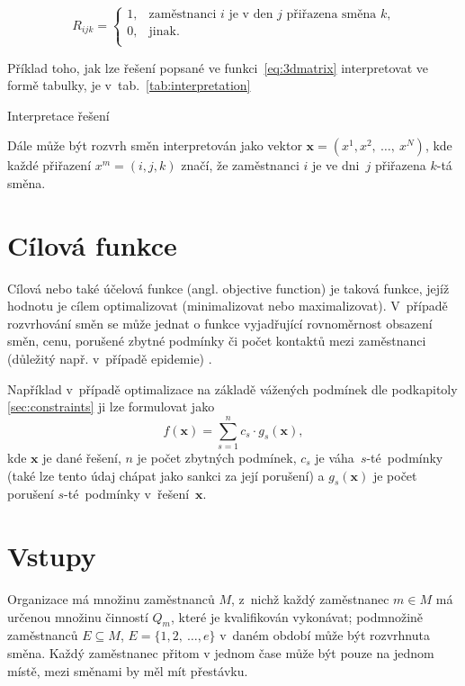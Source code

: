 \documentclass[twoside]{ctuthesis}
\begin{document}
\begin{equation}
	\label{eq:3dmatrix}
	R_{ijk} =
	\begin{cases}
		1, & \mbox{zaměstnanci $i$ je v den $j$ přiřazena směna $k$,} \\
		0, & \mbox{jinak.}\\
	\end{cases}
\end{equation}

Příklad toho, jak lze řešení popsané ve funkci~\ref{eq:3dmatrix} interpretovat ve formě tabulky, je v~tab.~\ref{tab:interpretation}
\begin{table}[h]
	
	\caption{Interpretace řešení}
	\label{tab:interpretation}
\end{table}

Dále může být rozvrh směn interpretován jako vektor $\boldsymbol{x} = (x^1, x^2,~\ldots,~x^N)$, kde každé přiřazení $x^m = (i, j, k)$ značí, že zaměstnanci $i$ je ve dni~$j$ přiřazena $k$-tá směna. \cite{awadallah2015hybrid}

\section{Cílová funkce}
\label{sec:objective}
Cílová nebo také účelová funkce (angl. objective function) je taková funkce, jejíž hodnotu je cílem optimalizovat (minimalizovat nebo maximalizovat). V~případě rozvrhování směn se může jednat o funkce vyjadřující rovnoměrnost obsazení směn, cenu, porušené zbytné podmínky \cite{blochliger2004modeling} či počet kontaktů mezi zaměstnanci (důležitý např. v~případě epidemie) \cite{zucchi2020personnel}.

Například v~případě optimalizace na základě vážených podmínek dle podkapitoly \ref{sec:constraints} ji lze formulovat jako
\begin{equation}
	f(\boldsymbol{x}) = \sum_{s = 1}^n c_s \cdot g_s(\boldsymbol{x}),
\end{equation}
kde $\boldsymbol{x}$ je dané řešení, $n$ je počet zbytných podmínek, $c_s$ je váha~$s$-té~podmínky (také lze tento údaj chápat jako sankci za její porušení) a $g_s(\boldsymbol{x})$ je počet porušení $s$-té~podmínky v~řešení~$\boldsymbol{x}$. \cite{awadallah2015hybrid}
\newpage

\section{Vstupy}
Organizace má množinu zaměstnanců $M$, z~nichž každý zaměstnanec $m \in M$ má určenou množinu činností $Q_m$, které je kvalifikován vykonávat; podmnožině zaměstnanců $E \subseteq M$, $E = \{ 1, 2,~\ldots, e \}$ v~daném období může být rozvrhnuta směna. Každý zaměstnanec přitom v jednom čase může být pouze na jednom místě, mezi směnami by měl mít přestávku.
\end{document}
